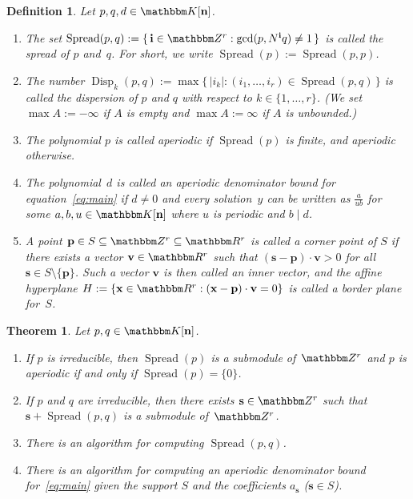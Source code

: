 \documentclass[a4paper]{sig-alternate}
\let\set\mathbbm
\def\vec#1{\mathbf{#1}}
\def\spread{\operatorname{Spread}}
\def\disp{\operatorname{Disp}}
\def\K{\set K}
\newtheorem{theorem}{Theorem}
\newtheorem{definition}{Definition}
\begin{document}
\begin{definition} Let $p,q,d\in\K[\vec n]$.
\begin{enumerate}
\item The set $\spread(p,q):=\{\,\vec i\in\set Z^r:\gcd(p,N^{\vec i}q)\neq1\,\}$ is called
  the \emph{spread} of $p$ and~$q$.
  For short, we write $\spread(p):=\spread(p,p)$.
\item The number $\disp_k(p,q):=\max\{\,|i_k|:(i_1,\dots,i_r)\in\spread(p,q)\,\}$ is called
  the \emph{dispersion} of $p$ and $q$ with respect to $k\in\{1,\dots,r\}$. (We set
  $\max A:=-\infty$ if $A$ is empty and $\max A:=\infty$ if $A$ is unbounded.)
\item The polynomial $p$ is called \emph{aperiodic} if $\spread(p)$ is finite, and \emph{aperiodic}
  otherwise.
\item The polynomial~$d$ is called an \emph{aperiodic denominator bound} for equation~\eqref{eq:main}
  if $d\neq0$ and every solution~$y$ can be written as $\frac{a}{ub}$ for some $a,b,u\in\K[\vec n]$
  where $u$ is periodic and $b\mid d$.
\item A point $\vec p\in S\subseteq\set Z^r\subseteq\set R^r$ is called a \emph{corner point} of $S$
  if there exists a vector $\vec v\in\set R^r$ such that $(\vec s-\vec p)\cdot\vec v>0$ for all
  $\vec s\in S\setminus\{\vec p\}$. Such a vector $\vec v$ is then called an \emph{inner vector,}
  and the affine hyperplane $H:=\{\vec x\in\set R^r:(\vec x-\vec p)\cdot\vec v=0\}$ is called a
  \emph{border plane} for~$S$.

  \medskip
  \centerline{}

\end{enumerate}
\end{definition}

\begin{theorem}\label{thm:1} Let $p,q\in\K[\vec n]$.
\begin{enumerate}
\item If $p$ is irreducible, then $\spread(p)$ is a submodule of~$\set Z^r$ and
  $p$ is aperiodic if and only if $\spread(p)=\{0\}$.
\item\label{thm:1.2} If $p$ and $q$ are irreducible, then there exists $\vec s\in\set Z^r$ such that
  $\vec s+\spread(p,q)$ is a submodule of~$\set Z^r$.
\item There is an algorithm for computing $\spread(p,q)$.
\item There is an algorithm for computing an aperiodic denominator bound for~\eqref{eq:main}
  given the support $S$ and the coefficients $a_{\vec s}$ ($\vec s\in S$).
\end{enumerate}
\end{theorem}
\end{document}
